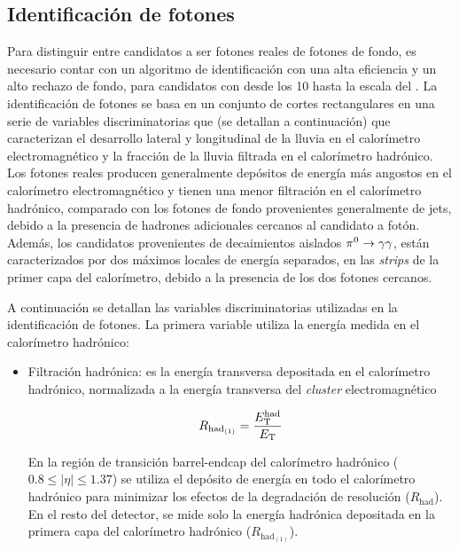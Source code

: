 \subsection{Identificación de fotones}
\label{sec:fotones}

Para distinguir entre candidatos a ser fotones reales de fotones de fondo, es
necesario contar con un algoritmo de identificación con una alta eficiencia y un alto rechazo
de fondo, para candidatos con {\et} desde los 10 {\gev} hasta la escala del
{\tev}. La identificación de fotones se basa en un conjunto de cortes
rectangulares en una serie de variables discriminatorias que (se detallan a continuación)
que caracterizan el desarrollo lateral y longitudinal de la
lluvia en el calorímetro electromagnético y la fracción de la lluvia filtrada en
el calorímetro hadrónico. Los fotones reales producen generalmente depósitos de
energía más angostos en el calorímetro electromagnético y tienen una menor
filtración en el calorímetro hadrónico, comparado con los fotones de fondo
provenientes generalmente de jets, debido a la presencia de hadrones adicionales cercanos al
candidato a fotón. Además, los candidatos provenientes de
decaimientos aislados $\pi^0 \to \gam\gam$, están caracterizados por dos máximos
locales de energía separados, en las \emph{strips} de la primer capa del calorímetro,
debido a la presencia de los dos fotones cercanos.

A continuación se detallan las variables discriminatorias utilizadas en la
identificación de fotones. La primera variable utiliza la energía medida en el
calorímetro hadrónico:

\begin{itemize}\itemsep0.2cm\parskip0.2cm

\item Filtración hadrónica: es la energía transversa depositada en el
  calorímetro hadrónico, normalizada a la energía transversa del \emph{cluster}
  electromagnético

  \begin{equation}
    R_{\mathrm{had}_{(1)}} = \frac{E_{\mathrm{T}}^{\mathrm{had}}}{E_{\mathrm{T}}}
  \end{equation}

  En la región de transición barrel-endcap del calorímetro hadrónico ($0.8\leq |\eta| \leq 1.37$) se utiliza
  el depósito de energía en todo el calorímetro hadrónico para minimizar los efectos de la
  degradación de resolución ($R_{\mathrm{had}}$). En el resto del detector, se mide solo la
  energía hadrónica depositada en la primera capa del calorímetro hadrónico ($R_{\mathrm{had}_{(1)}}$).
\end{itemize}

